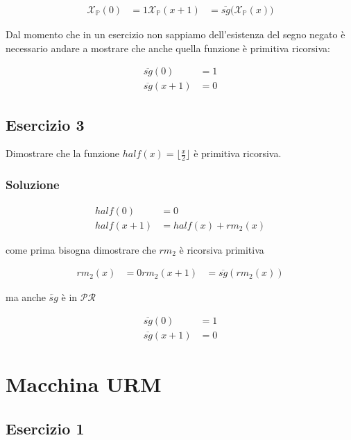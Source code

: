 \begin{align*}
\mathcal{X}_\mathbb{P}(0) &= 1
\mathcal{X}_\mathbb{P}(x+1) &= \overline{sg}\big(\mathcal{X}_\mathbb{P}(x)\big)
\end{align*}

Dal momento che in un esercizio non sappiamo dell'esistenza del segno negato è necessario andare a mostrare che anche quella funzione è primitiva ricorsiva:

\begin{align*}
 \overline{sg}(0) &= 1 \\
  \overline{sg}(x+1) &= 0
\end{align*}


\subsection{Esercizio 3}

Dimostrare che la funzione $ half(x) = \lfloor\frac{x}{2}\rfloor $ è primitiva ricorsiva.

\subsubsection{Soluzione}

\begin{align*}
half(0) &= 0 \\
half(x+1) &= half(x) + rm_2(x)
\end{align*}

come prima bisogna dimostrare che $ rm_2 $ è ricorsiva primitiva

\begin{align*}
rm_2(x) &= 0
rm_2(x+1) &= \overline{sg}(rm_2(x))
\end{align*}

ma anche $ \overleftarrow{sg} $ è in $ \mathcal{PR} $

\begin{align*}
\overline{sg}(0) &= 1 \\
\overline{sg}(x+1) &= 0
\end{align*}

\section{Macchina URM}

\subsection{Esercizio 1}

